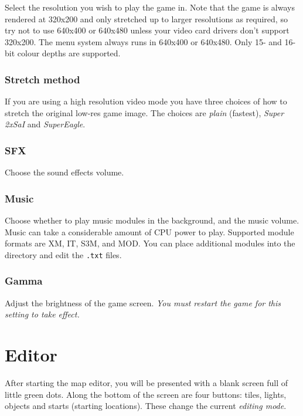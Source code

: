 \documentclass[a4paper]{article}
\begin{document}
Select the resolution you wish to play the game in.  Note that the
game is always rendered at 320x200 and only stretched up to larger
resolutions as required, so try not to use 640x400 or 640x480 unless
your video card drivers don't support 320x200.  The menu system always
runs in 640x400 or 640x480.  Only 15- and 16-bit colour depths are
supported.

\subsubsection*{Stretch method}

If you are using a high resolution video mode you have three choices
of how to stretch the original low-res game image.  The choices are
\emph{plain} (fastest), \emph{Super 2xSaI} and \emph{SuperEagle}.

\subsubsection*{SFX}

Choose the sound effects volume.

\subsubsection*{Music}

Choose whether to play music modules in the background, and the music
volume.  Music can take a considerable amount of CPU power to play.
Supported module formats are XM, IT, S3M, and MOD.  You can place
additional modules into the  directory and edit the
\texttt{.txt} files.

\subsubsection*{Gamma}

Adjust the brightness of the game screen.  \emph{You must restart the
game for this setting to take effect.}



\section{Editor}

After starting the map editor, you will be presented with a blank
screen full of little green dots.  Along the bottom of the screen are
four buttons: \textsf{tiles}, \textsf{lights}, \textsf{objects} and
\textsf{starts} (starting locations).  These change the current
\emph{editing mode}.
\end{document}
